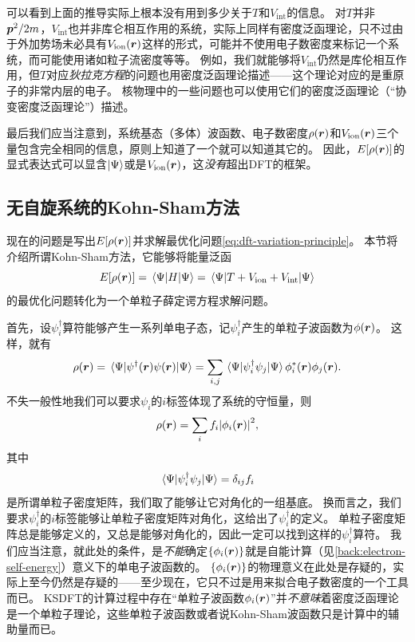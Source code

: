 可以看到上面的推导实际上根本没有用到多少关于$T$和$V_\text{int}$的信息。
对$T$并非$\vb*{p}^2 / 2m$，$V_\text{int}$也并非库仑相互作用的系统，实际上同样有密度泛函理论，只不过由于外加势场未必具有$V_\text{ion}(\vb*{r})$这样的形式，可能并不使用电子数密度来标记一个系统，而可能使用诸如粒子流密度等等。
例如，我们就能够将$V_\text{int}$仍然是库伦相互作用，但$T$对应\emph{狄拉克方程}的问题也用密度泛函理论描述——这个理论对应的是重原子的非常内层的电子。
核物理中的一些问题也可以使用它们的密度泛函理论（“协变密度泛函理论”）描述。

最后我们应当注意到，系统基态（多体）波函数、电子数密度$\rho(\vb*{r})$和$V_\text{ion}(\vb*{r})$三个量包含完全相同的信息，原则上知道了一个就可以知道其它的。
因此，$E[\rho(\vb*{r})]$的显式表达式可以显含$\ket{\Psi}$或是$V_\text{ion}(\vb*{r})$，这\emph{没有}超出DFT的框架。

\subsection{无自旋系统的Kohn-Sham方法}


现在的问题是写出$E[\rho(\vb*{r})]$并求解最优化问题\eqref{eq:dft-variation-principle}。
本节将介绍所谓Kohn-Sham方法，它能够将能量泛函
\begin{equation}
    E[\rho(\vb*{r})] = \mel{\Psi}{{H}}{\Psi} = \mel{\Psi}{{T} + {V}_\text{ion} + {V}_\text{int}}{\Psi}
\end{equation}
的最优化问题转化为一个单粒子薛定谔方程求解问题。

首先，设$\psi^\dagger_i$算符能够产生一系列单电子态，记${\psi}_i^\dagger$产生的单粒子波函数为$\phi(\vb*{r})$。
这样，就有
\[
    \rho(\vb*{r}) = \mel{\Psi}{\psi^\dagger(\vb*{r}) \psi(\vb*{r})}{\Psi} = \sum_{i, j} \mel{\Psi}{\psi^\dagger_i \psi_j}{\Psi} \phi_i^*(\vb*{r}) \phi_j(\vb*{r}).
\]
不失一般性地我们可以要求$\psi_i$的$i$标签体现了系统的守恒量，则
\begin{equation}
    \rho(\vb*{r}) = \sum_{i} f_i \abs{\phi_i(\vb*{r})}^2,
    \label{eq:kohn-sham-density}
\end{equation}
其中
\begin{equation}
    \mel{\Psi}{\psi^\dagger_i \psi_j}{\Psi} = \delta_{ij} f_i
\end{equation}
是所谓单粒子密度矩阵，我们取了能够让它对角化的一组基底。
换而言之，我们要求$\psi_i^\dagger$的$i$标签能够让单粒子密度矩阵对角化，这给出了$\psi_i^\dagger$的定义。
单粒子密度矩阵总是能够定义的，又总是能够对角化的，因此一定可以找到这样的$\psi_i^\dagger$算符。
我们应当注意，就此处的条件，是\emph{不能}确定$\{\phi_i (\vb*{r})\}$就是自能计算（见\autoref{back:electron-self-energy}）意义下的单电子波函数的。
$\{\phi_i (\vb*{r})\}$的物理意义在此处是存疑的，实际上至今仍然是存疑的——至少现在，它只不过是用来拟合电子数密度的一个工具而已。
KSDFT的计算过程中存在“单粒子波函数$\phi_i(\vb*{r})$”并\emph{不意味}着密度泛函理论是一个单粒子理论，这些单粒子波函数或者说Kohn-Sham波函数只是计算中的辅助量而已。

